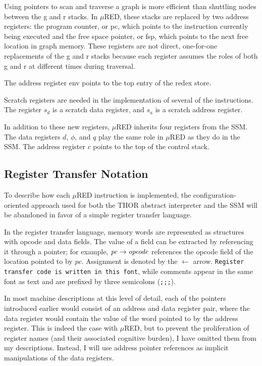 Using pointers to scan and traverse a graph is more efficient than shuttling nodes between the g and r stacks. In \(\mu\)RED, these stacks are replaced by two address registers: the program counter, or pc, which points to the instruction currently being executed and the free space pointer, or fsp, which points to the next free location in graph memory. These registers are not direct, one-for-one replacements of the g and r stacks because each register assumes the roles of both g and r at different times during traversal.

The address register env points to the top entry of the redex store.

Scratch registers are needed in the implementation of several of the instructions. The
register \(s_d\) is a scratch data register, and \(s_a\) is a scratch address register.

In addition to these new registers, \(\mu\)RED inherits four registers from the SSM. The data registers \(d\), \(\phi\), and \(q\) play the same role in \(\mu\)RED as they do in the SSM. The address register \(c\) points to the top of the control stack.

\subsection{Register Transfer Notation}

To describe how each \(\mu\)RED instruction is implemented, the configuration-oriented approach used for both the THOR abstract interpreter and the SSM will be abandoned in favor of a simple register transfer language.

In the register transfer language, memory words are represented as structures with opcode and data fields. The value of a field can be extracted by referencing it through a pointer; for example, \(\mathit{pc}\rightarrow\mathit{opcode}\) references the opcode field of the location pointed to by \(pc\). Assignment is denoted by the \(\leftarrow\) arrow. \texttt{Register transfer code is written in this font}, while comments appear in the same font as text and are prefixed by three semicolons (\texttt{;;;}).

In most machine descriptions at this level of detail, each of the pointers introduced earlier would consist of an address and data register pair, where the data register would contain the value of the word pointed to by the address register. This is indeed the case with \(\mu\)RED, but to prevent the proliferation of register names (and their associated cognitive burden), I have omitted them from my descriptions. Instead, I will use address pointer references as implicit manipulations of the data registers.

